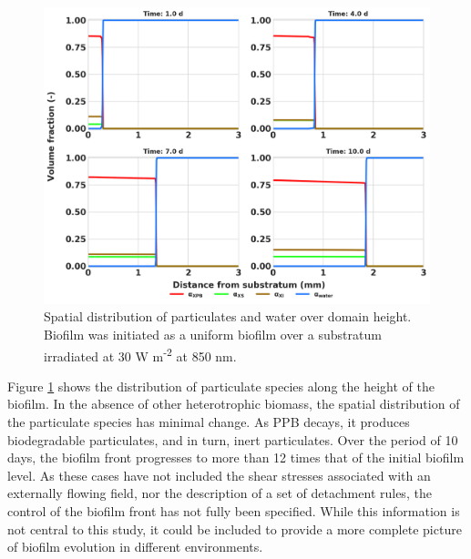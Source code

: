\begin{figure}[H]
    \centering
    \includegraphics[width=\textwidth,height=0.45\textheight]{Chap4/methods/output/case1.png}
    \caption{Spatial distribution of particulates and water over domain height. Biofilm was initiated as a uniform biofilm over a substratum irradiated at 30 W m\textsuperscript{-2} at 850 nm.} 
    \label{fig:case1_dist_frac}
\end{figure}
 
 Figure \ref{fig:case1_dist_frac} shows the distribution of particulate species along the height of the biofilm. In the absence of other heterotrophic biomass, the spatial distribution of the particulate species has minimal change. As PPB decays, it produces biodegradable particulates, and in turn, inert particulates. Over the period of 10 days, the biofilm front progresses to more than 12 times that of the initial biofilm level. As these cases have not included the shear stresses associated with an externally flowing field, nor the description of a set of detachment rules, the control of the biofilm front has not fully been specified. While this information is not central to this study, it could be included to provide a more complete picture of biofilm evolution in different environments.





